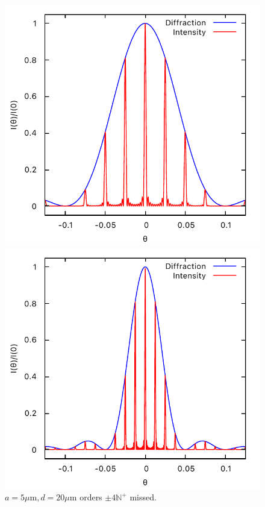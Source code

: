 \documentclass[11pt, twoside]{article}   	%
\theoremstyle{plain}
\theoremstyle{definition}
\begin{document}
\begin{description}
\begin{figure}[htbp]
		\begin{minipage}[t]{0.33\linewidth}
		\centering
		\includegraphics[width=0.9\linewidth]{5-20}
		\caption{\centering $a = 5\mu\mathrm{m}, d = 20\mu\mathrm{m}$
			\newline orders $\pm 4\mathbb N^+$ missed.}
		\end{minipage}
		\begin{minipage}[t]{0.33\linewidth}
		\centering
		\includegraphics[width=0.9\linewidth]{10-40}

\end{minipage}
\end{figure}
\end{description}
\end{document}
